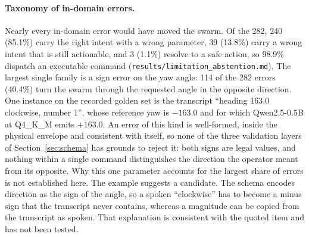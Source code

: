 \paragraph{Taxonomy of in-domain errors.} Nearly every in-domain error would have moved the swarm.
Of the 282, 240 (85.1\%) carry the right intent with a wrong parameter, 39 (13.8\%) carry a wrong
intent that is still actionable, and 3 (1.1\%) resolve to a safe action, so 98.9\% dispatch an
executable command (\texttt{results/limitation\_abstention.md}). The largest single family is a sign error on the yaw angle: 114 of the 282
errors (40.4\%) turn the swarm through the requested angle in the opposite direction. One instance
on the recorded golden set is the transcript ``heading 163.0 clockwise, number 1'', whose
reference yaw is $-163.0$ and for which Qwen2.5-0.5B at Q4\_K\_M emits $+163.0$. An error of this
kind is well-formed, inside the physical envelope and consistent with itself, so none of the three
validation layers of Section~\ref{sec:schema} has grounds to reject it: both signs are legal
values, and nothing within a single command distinguishes the direction the operator meant from its
opposite. Why this one parameter accounts for the largest share of errors is not established here.
The example suggests a candidate. The schema encodes direction as the sign of the angle, so a spoken
``clockwise'' has to become a minus sign that the transcript never contains, whereas a magnitude can
be copied from the transcript as spoken. That explanation is consistent with the quoted item and
has not been tested.

